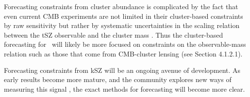 Forecasting constraints from cluster abundance is complicated by the fact that even current CMB 
experiments are not limited in their cluster-based constraints by raw sensitivity but rather by systematic
uncertainties in the scaling relation between the tSZ observable and the cluster mass 
\cite{Reichardt:2012yj,Ade:2015fva}. Thus the cluster-based forecasting for \cmbexp\ will likely be more
focused on constraints on the observable-mass relation such as those that come from CMB-cluster
lensing (see Section 4.1.2.1).

Forecasting constraints from kSZ will be an ongoing avenue of development. As early results become
more mature, and the community explores new ways of measuring this signal 
\cite{Hand:2012ui,Keisler:2012eg,Ade:2015lza,Schaan:2015uaa,Hill:2016dta,Soergel:2016mce}, the exact methods for forecasting
will become more clear.
